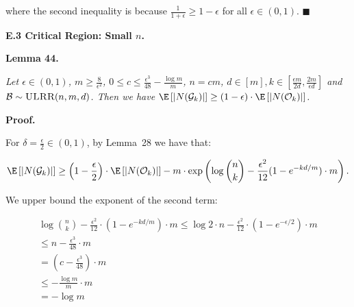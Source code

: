 \documentclass[10pt,a4paper]{article}
\begin{document}
where the second inequality is because $\frac{1}{1+\epsilon}\geq 1-\epsilon$ for all $\epsilon\in(0,1)$.
\ensuremath{\blacksquare}\par






\par\medskip\noindent\textbf{E.3 Critical Region: Small $n$.}\par





\par\medskip\noindent\textbf{\textbf{Lemma 44}\textbf{.}}\par



\emph{Let $\epsilon\in(0,1)$, $m\geq\frac{8}{\epsilon^{2}}$, $0\leq c\leq\frac{\epsilon^{3}}{48}-\frac{\log{m}}{m}$, $n=cm$, $d\in[m],k\in[\frac{\epsilon m}{2d},\frac{2m}{\epsilon d}]$ and $\mathcal{B}\sim\textsc{ULRR}(n,m,d)$.
Then we have $\E\left[|N(\mathcal{G}_{k})|\right]\geq\left(1-\epsilon\right)\cdot\E\left[|N(\mathcal{O}_{k})|\right]$.}\par






\par\medskip\noindent\textbf{Proof.}\par



For $\delta=\frac{\epsilon}{2}\in(0,1)$, by Lemma 28 we have that:\par


\[\begin{gathered}
\displaystyle\E\left[|N(\mathcal{G}_{k})|\right]\geq\left(1-\frac{\epsilon}{2}\right)\cdot\E\left[|N(\mathcal{O}_{k})|\right]-m\cdot\exp\left(\log{\binom{n}{k}}-\frac{\epsilon^{2}}{12}(1-e^{-kd/m})\cdot m\right).
\end{gathered}\]


We upper bound the exponent of the second term:\par


\[\begin{gathered}
\displaystyle\log{\binom{n}{k}}-\frac{\epsilon^{2}}{12}\cdot(1-e^{-kd/m})\cdot m \displaystyle\leq\log{2}\cdot n-\frac{\epsilon^{2}}{12}\cdot(1-e^{-\epsilon/2})\cdot m \\
\displaystyle\leq n-\frac{\epsilon^{3}}{48}\cdot m \\
\displaystyle=\left(c-\frac{\epsilon^{3}}{48}\right)\cdot m \\
\displaystyle\leq-\frac{\log{m}}{m}\cdot m \\
\displaystyle=-\log{m}
\end{gathered}\]
\end{document}
